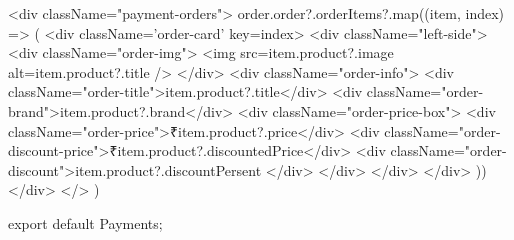 {            <div className="payment-orders">
                {order.order?.orderItems?.map((item, index) => (
                    <div className='order-card' key={index}>
                        <div className="left-side">
                            <div className="order-img">
                                <img src={item.product?.image} alt={item.product?.title} />
                            </div>
                            <div className="order-info">
                                <div className="order-title">{item.product?.title}</div>
                                <div className="order-brand">{item.product?.brand}</div>
                                <div className="order-price-box">
                                    <div className="order-price">₹{item.product?.price}</div>
                                    <div className="order-discount-price">₹{item.product?.discountedPrice}</div>
                                    <div className="order-discount">{item.product?.discountPersent}%
                                </div>
                            </div>
                        </div>
                    </div>
                ))}
            </div>
        </>
    )
}

export default Payments;
